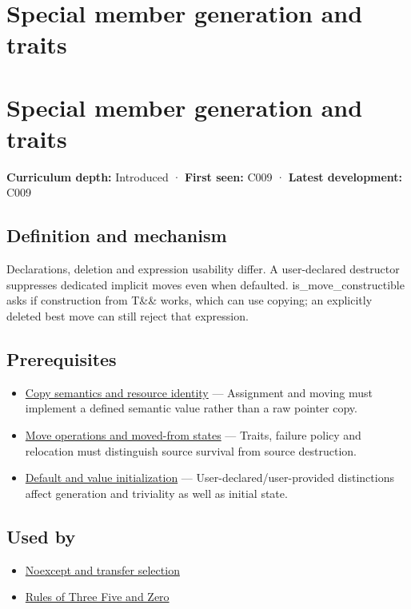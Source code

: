 \hypertarget{appendix-42e02a12c694}{}
\section*{Special member generation and traits}
\section{Special member generation and traits}\label{special-member-generation-and-traits}

\textbf{Curriculum depth:} Introduced · \textbf{First seen:} C009 · \textbf{Latest development:} C009

\subsection{Definition and mechanism}\label{definition-and-mechanism}

Declarations, deletion and expression usability differ. A user-declared destructor suppresses dedicated implicit moves even when defaulted. is\_move\_constructible asks if construction from T\&\& works, which can use copying; an explicitly deleted best move can still reject that expression.

\subsection{Prerequisites}\label{prerequisites}

\begin{itemize}
\tightlist
\item
  \hyperref[appendix-1340cd1ce582]{Copy semantics and resource identity} --- Assignment and moving must implement a defined semantic value rather than a raw pointer copy.
\item
  \hyperref[appendix-5636651017c2]{Move operations and moved-from states} --- Traits, failure policy and relocation must distinguish source survival from source destruction.
\item
  \hyperref[appendix-ba8c1a9fe03f]{Default and value initialization} --- User-declared/user-provided distinctions affect generation and triviality as well as initial state.
\end{itemize}

\subsection{Used by}\label{used-by}

\begin{itemize}
\tightlist
\item
  \hyperref[appendix-c746afaa47d1]{Noexcept and transfer selection}
\item
  \hyperref[appendix-7679107d057e]{Rules of Three Five and Zero}
\end{itemize}


